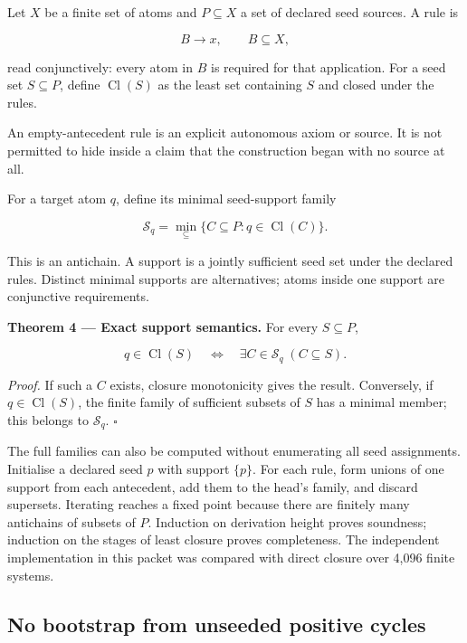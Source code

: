 \documentclass[11pt,a4paper]{article}
\begin{document}
Let \(X\) be a finite set of atoms and \(P\subseteq X\) a set of
declared seed sources. A rule is

\nopagebreak[4]

\[
B\longrightarrow x,\qquad B\subseteq X,
\]

read conjunctively: every atom in \(B\) is required for that
application. For a seed set \(S\subseteq P\), define
\(\operatorname{Cl}(S)\) as the least set containing \(S\) and closed
under the rules.

An empty-antecedent rule is an explicit autonomous axiom or source. It
is not permitted to hide inside a claim that the construction began with
no source at all.

For a target atom \(q\), define its minimal seed-support family

\nopagebreak[4]

\[
\mathscr S_q
 =\min_{\subseteq}\{C\subseteq P:q\in\operatorname{Cl}(C)\}.
\]

This is an antichain. A support is a jointly sufficient seed set under
the declared rules. Distinct minimal supports are alternatives; atoms
inside one support are conjunctive requirements.


\textbf{Theorem 4 --- Exact support semantics.} For every
\(S\subseteq P\),

\nopagebreak[4]

\[
q\in\operatorname{Cl}(S)
\quad\Longleftrightarrow\quad
\exists C\in\mathscr S_q\;(C\subseteq S).
\]

\emph{Proof.} If such a \(C\) exists, closure monotonicity gives the
result. Conversely, if \(q\in\operatorname{Cl}(S)\), the finite family
of sufficient subsets of \(S\) has a minimal member; this belongs to
\(\mathscr S_q\). \(\square\)

The full families can also be computed without enumerating all seed
assignments. Initialise a declared seed \(p\) with support \(\{p\}\).
For each rule, form unions of one support from each antecedent, add them
to the head's family, and discard supersets. Iterating reaches a fixed
point because there are finitely many antichains of subsets of \(P\).
Induction on derivation height proves soundness; induction on the stages
of least closure proves completeness. The independent implementation in
this packet was compared with direct closure over 4,096 finite systems.

\subsection{No bootstrap from unseeded positive
cycles}\label{no-bootstrap-from-unseeded-positive-cycles}
\end{document}
